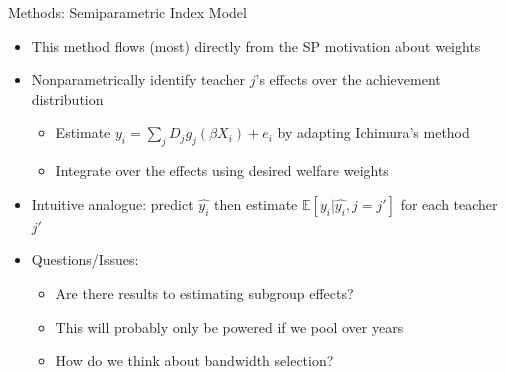 \documentclass[t,aspectratio=169,11pt]{beamer}
\begin{document}

\begin{frame}{Methods: Semiparametric Index Model}

\begin{itemize}

    \item This method flows (most) directly from the SP motivation about weights
    
    \item  Nonparametrically identify teacher $j$'s effects over the achievement distribution
    \begin{itemize}
        \item Estimate $y_i = \sum _j D_j g_j(\beta X_i) +e_i$  by adapting Ichimura's method \citep{ichimura1993semiparametric}
        \item Integrate over the effects using desired welfare weights
    \end{itemize}
    
    \item Intuitive analogue: predict $\hat{y_i}$ then estimate $\mathbb{E}[y_i|\hat{y_i},j=j']$ for each teacher $j'$

    \item Questions/Issues:
    \begin{itemize}
         \item Are there results to estimating subgroup effects?
         \item This will probably only be powered if we pool over years
         \item How do we think about bandwidth selection? 
    \end{itemize}


\end{itemize}

\vfill
\begin{flushleft}

\hyperlink{next}{}
\end{flushleft}
\end{frame}
\end{document}
